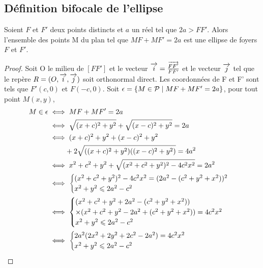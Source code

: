 \subsection{Définition bifocale de l'ellipse}
\begin{prop}
  \label{prop:bifellipse}
  Soient \(F\) et \(F'\) deux points distincts et \(a\) un réel tel que
  \(2a>FF'\). Alors l'ensemble des points M du plan tel que \(MF + MF' = 2a\) est
  une ellipse de foyers \(F\) et \(F'\).
\end{prop}
\begin{proof}
  Soit O le milieu de \([FF']\) et le vecteur \(\overrightarrow{i} = \frac{\overrightarrow{FF'}}{FF'}\) et
  le vecteur \(\overrightarrow{j}\) tel que le repère \(R = (O,\overrightarrow{i},\overrightarrow{j})\) soit orthonormal direct. Les
  coordonnées de F et F' sont tels que \(F'(c, 0)\) et \(F(-c, 0)\). Soit
  \(\epsilon = \left\{M \in \mathcal{P}\mathrel{}\middle|\mathrel{}MF + MF' = 2a\right\}\), pour tout point \(M(x, y)\),
  \begin{align}
    M \in \epsilon & \iff MF + MF' = 2a \\
                   & \iff \sqrt{(x + c)^2 + y^2} + \sqrt{(x-c)^2 + y^2} = 2a \\
                   & \iff (x + c)^2 + y^2 + (x-c)^2 + y^2 \notag \\
                   & \phantom{\iff} + 2\sqrt{((x + c)^2 + y^2)((x-c)^2 + y^2)} = 4a^2
                   \label{eq:tag:1}\\
                   & \iff x^2 + c^2 + y^2 + \sqrt{(x^2 + c^2 + y^2)^2-4c^2x^2} = 2a^2\\
                   & \iff \begin{cases} (x^2 + c^2 + y^2)^2-4c^2x^2 =
                     (2a^2-(c^2 + y^2 + x^2))^2 \\ x^2 + y^2 \leqslant 2a^2
                   -c^2\\\end{cases}\\
                   & \iff \begin{cases} (x^2 + c^2 + y^2 + 2a^2-(c^2 + y^2 + x^2)) \\
                     \times (x^2 + c^2 + y^2 - 2a^2 + (c^2 + y^2 + x^2)) = 4c^2x^2  \\ x^2 + y^2
                   \leqslant 2a^2 -c^2\end{cases}\\
                   & \iff \begin{cases} 2a^2(2x^2 + 2y^2 + 2c^2-2a^2) = 4c^2x^2  \\
                   x^2 + y^2 \leqslant 2a^2 -c^2\end{cases}\\

\end{align}
\end{proof}
